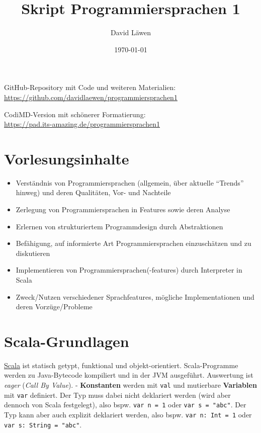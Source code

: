 \documentclass[]{article}
\title{Skript Programmiersprachen 1}
\author{David Läwen}
\date{\today}
\providecommand{\tightlist}{%
  \setlength{\itemsep}{0pt}\setlength{\parskip}{0pt}}
\begin{document}
\maketitle

GitHub-Repository mit Code und weiteren Materialien: \\
\url{https://github.com/davidlaewen/programmiersprachen1}

CodiMD-Version mit schönerer Formatierung: \\
\url{https://pad.its-amazing.de/programmiersprachen1}

\tableofcontents

\hypertarget{vorlesungsinhalte}{%
\section{Vorlesungsinhalte}}

\begin{itemize}
\tightlist
\item
  Verständnis von Programmiersprachen (allgemein, über aktuelle
  ``Trends'' hinweg) und deren Qualitäten, Vor- und Nachteile
\item
  Zerlegung von Programmiersprachen in Features sowie deren Analyse
\item
  Erlernen von strukturiertem Programmdesign durch Abstraktionen
\item
  Befähigung, auf informierte Art Programmiersprachen einzuschätzen und
  zu diskutieren
\item
  Implementieren von Programmiersprachen(-features) durch Interpreter in
  Scala
\item
  Zweck/Nutzen verschiedener Sprachfeatures, mögliche Implementationen
  und deren Vorzüge/Probleme
\end{itemize}

\hypertarget{scala-grundlagen}{%
\section{Scala-Grundlagen}\label{scala-grundlagen}}

\href{https://scala-lang.org/}{Scala} ist statisch getypt, funktional
und objekt-orientiert. Scala-Programme werden zu Java-Bytecode
kompiliert und in der JVM ausgeführt. Auswertung ist \emph{eager}
(\emph{Call By Value}). - \textbf{Konstanten} werden mit \texttt{val}
und mutierbare \textbf{Variablen} mit \texttt{var} definiert. Der Typ
muss dabei nicht deklariert werden (wird aber dennoch von Scala
festgelegt), also bspw. \texttt{var\ n\ =\ 1} oder
\texttt{var\ s\ =\ "abc"}. Der Typ kann aber auch explizit deklariert
werden, also bspw. \texttt{var\ n:\ Int\ =\ 1} oder
\texttt{var\ s:\ String\ =\ "abc"}.
\end{document}
